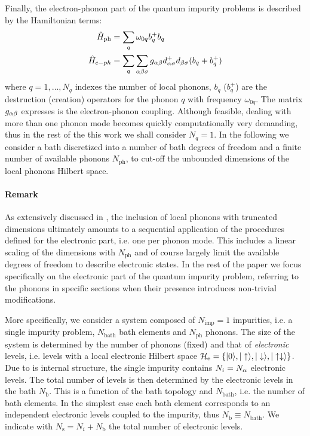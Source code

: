 \documentclass[edipack2.tex]{subfiles}
\begin{document}
Finally, the electron-phonon part of the quantum impurity problems is
described by the Hamiltonian terms: 
\begin{equation}\label{Hph}
  \begin{split}
    \hat{H}_\mathrm{ph}&=\sum_q \omega_{0q} b_q^+b_q\\
    \hat{H}_{e-ph} &= \sum_q\sum_{\alpha\beta\sigma} g_{\alpha\beta} d^+_{\alpha\sigma}d_{\beta\sigma}(b_q+b_q^+)
\end{split}
\end{equation}
where $q=1,\dots,N_q$ indexes the number of local phonons, $b_q$
($b_q^+$) are the destruction (creation) operators for the phonon $q$
with frequency $\omega_{0q}$. The matrix  $g_{\alpha\beta}$ expresses is the electron-phonon coupling. 
Although feasible, dealing with more than one phonon mode becomes
quickly computationally very demanding, thus in the rest of the this
work we shall consider $N_q=1$. 
In the following we consider a bath discretized into a  number
of bath degrees of freedom and a finite number of available phonons $N_\mathrm{ph}$,
to cut-off the unbounded dimensions of the local phonons Hilbert space.


\paragraph{{\bf Remark}} As extensively discussed in
, the inclusion of local phonons with
truncated dimensions ultimately amounts to a sequential application of
the procedures defined for the electronic part, i.e. one per phonon
mode. This includes a linear scaling of the dimensions with $N_\mathrm{ph}$
and of course largely limit the available degrees of freedom to
describe electronic states. In the rest of the paper we focus
specifically on the electronic part of the quantum impurity problem,
referring to the phonons in specific sections when their presence
introduces non-trivial modifications.  


More specifically, we consider a system composed of $N_\mathrm{imp}=1$
impurities, i.e. a single impurity problem, $N_\mathrm{bath}$ bath elements
and $N_\mathrm{ph}$ phonons. The size of the system is determined by
the number of phonons (fixed) and that of {\it electronic} levels, i.e. levels with a local
electronic Hilbert space
${\cal H}_\mathrm{e}=\{|0\rangle,|\uparrow\rangle,|\downarrow\rangle,|\uparrow\downarrow\rangle \}$. 
Due to is internal structure, the single impurity contains
$N_i= N_\alpha$ electronic levels.
The total number of levels is then determined by
the electronic levels in the bath $N_\mathrm{b}$. This is a function of the bath topology and $N_\mathrm{bath}$,
i.e. the number of bath elements. In the simplest case each bath
element corresponds to an independent electronic levels coupled to the
impurity, thus $N_\mathrm{b}\equiv N_\mathrm{bath}$. 
We indicate with $N_\mathrm{s}=N_i + N_\mathrm{b}$ the total number of electronic levels. 
\end{document}
